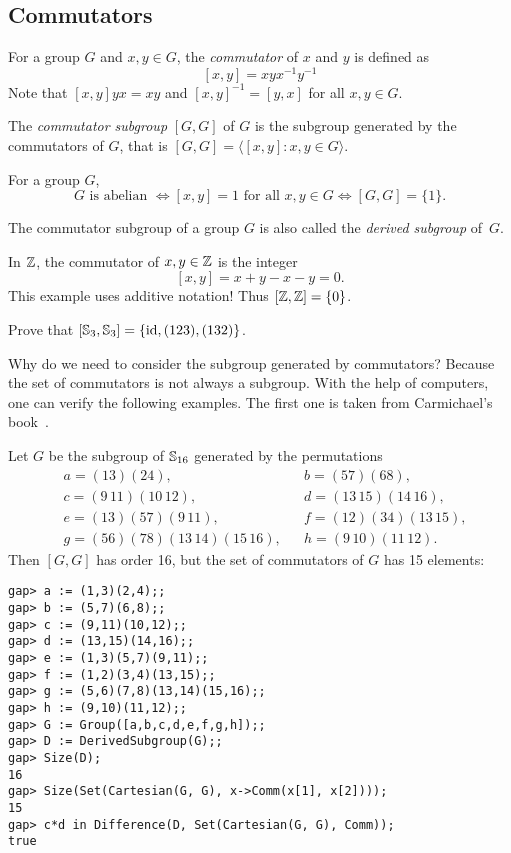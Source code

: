 \subsection{Commutators}

For a group $G$ and $x,y\in G$, the \emph{commutator} 
of $x$ and $y$ is defined as 
\[
[x,y]=xyx^{-1}y^{-1}
\]
Note that $[x,y]yx=xy$ and 
$[x,y]^{-1}=[y,x]$ for all $x,y\in G$. 

\begin{definition}
        The \emph{commutator subgroup}
        $[G,G]$ of $G$ 
        is the subgroup generated by 
        the commutators of $G$, that is 
        $[G,G]=\langle[x,y]: x,y\in G\rangle$. 
\end{definition}

For a group $G$, 
\[
G\text{ is abelian }
\Longleftrightarrow [x,y]=1\text{ for all $x,y\in G$}
\Longleftrightarrow [G,G]=\{1\}.
\]

The commutator subgroup of a group $G$ is also called the \emph{derived subgroup} of~$G$. 
       
\begin{example}
        In $\mathbb{Z}$, the commutator of $x,y\in \mathbb{Z}$ 
        is the integer
        \[
        [x,y]=x+y-x-y=0.
        \]
        This example uses additive notation! 
        Thus $[\mathbb{Z},\mathbb{Z}]=\{0\}$. 
\end{example}
        
\begin{exercise}
        Prove that $[\mathbb{S}_3,\mathbb{S}_3]=\{\operatorname{id},(123),(132)\}$.
\end{exercise}
        
Why do we need to consider the subgroup 
generated by commutators? Because the set of commutators 
is not always a subgroup. With the help of computers, 
one can verify the following examples. 
The first one is taken from Carmichael's book~\cite{MR0075938}.

\begin{example}
        Let $G$ be the subgroup of $\mathbb{S}_{16}$ 
        generated by the permutations 
        \begin{align*}
&a = (13)(24),&&
b = (57)(68),\\
&c = (9\,11)(10\,12),&&
d = (13\,15)(14\,16),\\
&e = (13)(57)(9\,11),&&
f = (12)(34)(13\,15),\\
&g = (56)(78)(13\,14)(15\,16),&&
h = (9\,10)(11\,12).
\end{align*}
Then $[G,G]$ has order 16, but the set of commutators of 
$G$ has 15 elements:
\begin{lstlisting}
gap> a := (1,3)(2,4);;
gap> b := (5,7)(6,8);;
gap> c := (9,11)(10,12);;
gap> d := (13,15)(14,16);;
gap> e := (1,3)(5,7)(9,11);;
gap> f := (1,2)(3,4)(13,15);;
gap> g := (5,6)(7,8)(13,14)(15,16);;
gap> h := (9,10)(11,12);;
gap> G := Group([a,b,c,d,e,f,g,h]);;
gap> D := DerivedSubgroup(G);;
gap> Size(D);
16
gap> Size(Set(Cartesian(G, G), x->Comm(x[1], x[2])));
15
gap> c*d in Difference(D, Set(Cartesian(G, G), Comm));
true
\end{lstlisting}
\end{example}

